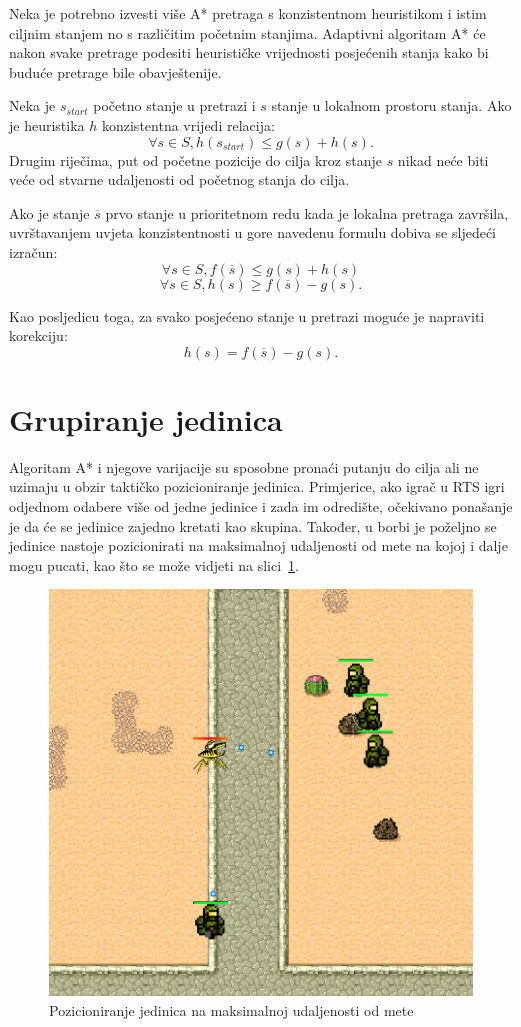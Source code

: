 \documentclass[times, utf8, zavrsni, numeric]{fer}
\begin{document}
\par Neka je potrebno izvesti više A* pretraga s konzistentnom heuristikom i istim ciljnim stanjem no s različitim početnim stanjima. Adaptivni algoritam A* će nakon svake pretrage podesiti heurističke vrijednosti posjećenih stanja kako bi buduće pretrage bile obavještenije\cite{article:RTAAStar}.

\par Neka je \(s_{start}\) početno stanje u pretrazi i \(s\) stanje u lokalnom prostoru stanja. Ako je heuristika \(h\) konzistentna vrijedi relacija:
\[\forall s \in S, h(s_{start}) \leq g(s) + h(s).\]
Drugim riječima, put od početne pozicije do cilja kroz stanje \(s\) nikad neće biti veće od stvarne udaljenosti od početnog stanja do cilja.

\par Ako je stanje \(\overline{s}\) prvo stanje u prioritetnom redu kada je lokalna pretraga završila, uvrštavanjem uvjeta konzistentnosti u gore navedenu formulu dobiva se sljedeći izračun:
\[\forall s \in S, f(\overline{s}) \leq g(s) + h(s)\]
\[\forall s \in S, h(s) \geq f(\overline{s}) - g(s).\]

\par Kao posljedicu toga, za svako posjećeno stanje u pretrazi moguće je napraviti korekciju:
\[h(s) = f(\overline{s}) - g(s).\]


\section{Grupiranje jedinica}\label{sec:grouping}

\par Algoritam A* i njegove varijacije su sposobne pronaći putanju do cilja ali ne uzimaju u obzir taktičko pozicioniranje jedinica. 
Primjerice, ako igrač u RTS igri odjednom odabere više od jedne jedinice i zada im odredište, očekivano ponašanje je da će se jedinice zajedno kretati kao skupina. 
Također, u borbi je poželjno se jedinice nastoje pozicionirati na maksimalnoj udaljenosti od mete na kojoj i dalje mogu pucati, kao što se može vidjeti na slici~\ref{fig:enemySeparation}.

\begin{figure}[h]
	\centering
	\includegraphics[width=0.5\linewidth]{images/enemySeparation.png}
	\caption{Pozicioniranje jedinica na maksimalnoj udaljenosti od mete}
	\label{fig:enemySeparation}
\end{figure}
\end{document}
